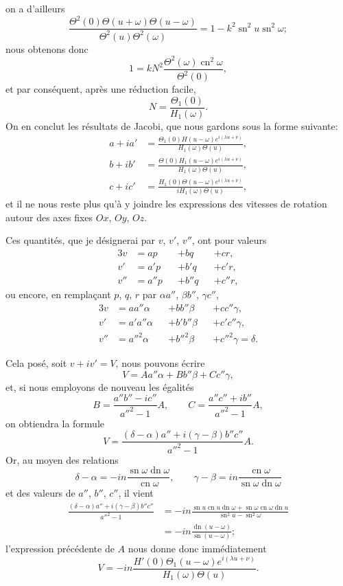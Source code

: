 \documentclass[11pt,leqno,oneside,letterpaper]{book}[2005/09/16]
\DeclareMathOperator{\sn}{sn}
\DeclareMathOperator{\cn}{cn}
\DeclareMathOperator{\dn}{dn}
\begin{document}
on a d'ailleurs
\[
\frac{\Theta^2(0)\Theta(u+\omega)\Theta(u-\omega)}{\Theta^2(u)\Theta^2(\omega)}
  = 1- k^2\sn^2 u \sn^2 \omega ;
\]
nous obtenons donc
\[
  1 = kN^2 \frac{\Theta^2(\omega) \cn^2 \omega}{\Theta^2 (0)},
\]
et par cons\'equent, apr\`es une r\'eduction facile,
\[
  N = \frac{\Theta_1(0)}{H_1(\omega)} .
\]
On en conclut les r\'esultats de Jacobi, que nous gardons sous la forme
suivante:
\begin{align*}
  a+ia' &=
\frac{ \Theta_1(0) H(u-\omega) e^{i(\lambda u+\nu)} }{ H_1(\omega) \Theta(u) },
\\
  b+ib' &=
\frac{ \Theta(0) H_1(u-\omega) e^{i(\lambda u+\nu)} }{ H_1(\omega) \Theta(u) },
\\
  c+ic' &=
\frac{ H_1(0) \Theta(u-\omega) e^{i(\lambda u+\nu)} }{ i H_1(\omega) \Theta(u) },
\end{align*}
et il ne nous reste plus qu'\`a y joindre les expressions des vitesses de rotation
autour des axes fixes $Ox$, $Oy$, $Oz$.

Ces quantit\'es, que je d\'esignerai par $v$, $v'$, $v''$, ont pour valeurs
\begin{alignat*}{3}
  v  &= ap  &&+ bq  &&+ cr, \\
  v' &= a'p &&+ b'q &&+ c'r, \\
  v''&= a''p&&+ b''q&&+ c''r,
\end{alignat*}
ou encore, en rempla\c{c}ant $p$, $q$, $r$ par $\alpha a''$, $\beta b''$, $\gamma c''$,
\begin{alignat*}{3}
  v  &= aa'' \alpha &&+ bb'' \beta &&+ cc''\gamma, \\
  v' &= a'a'' \alpha &&+ b'b'' \beta &&+ c'c'' \gamma , \\
  v''&= a''^2 \alpha &&+ b''^2 \beta &&+ c''^2 \gamma = \delta .
\end{alignat*}

Cela pos\'e, soit $v+iv' = V$, nous pouvons \'ecrire
\[
  V = A a'' \alpha + B b'' \beta + C c'' \gamma,
\]
et, si nous employons de nouveau les \'egalit\'es
\[
  B = \frac{a'' b'' -ic''}{a''^2-1} A, \qquad
  C = \frac{a'' c'' +ib''}{a''^2-1} A,
\]
on obtiendra la formule
\[
  V = \frac{(\delta-\alpha)a'' + i(\gamma-\beta)b''c''}{a''^2-1} A.
\]
Or, au moyen des relations
\[
  \delta-\alpha = -in \frac{\sn\omega\dn\omega}{\cn\omega}, \qquad
  \gamma-\beta  = in \frac{\cn\omega}{\sn\omega\dn\omega}
\]
et des valeurs de $a''$, $b''$, $c''$, il vient
\begin{align*}
  \frac{(\delta-\alpha)a'' + i(\gamma-\beta)b''c''}{a''^2-1} &=
  -in \frac{\sn u\cn u\dn\omega + \sn\omega\cn\omega\dn u}{\sn^2 u - \sn^2\omega} \\
  &= -in \frac{\dn(u-\omega)}{\sn(u-\omega)} ;
\end{align*}
l'expression pr\'ec\'edente de $A$ nous donne donc imm\'ediatement
\[
  V= -in \frac{H'(0)\Theta_1(u-\omega) e^{i(\lambda u+\nu)} }{H_1(\omega)\Theta(u)} .
\]
\end{document}
